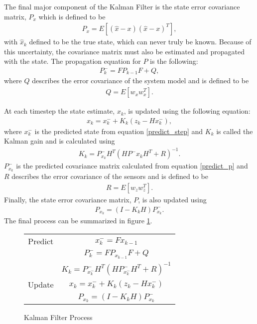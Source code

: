 The final major component of the Kalman Filter is the state error covariance matrix, $P_x$ which is defined to be \cite{kf_derivation}
\begin{align}
P_x = E[(\hat{x} - x)(\hat{x} - x)^T],
\end{align} 
with $\hat{x}_k$ defined to be the true state, which can never truly be known. Because of this uncertainty, the covariance matrix must also be estimated and propagated with the state. The propagation equation for $P$ is the following:
\begin{align}\label{predict_p}
P^-_{k} = FP_{k-1}F + Q,
\end{align} 
where $Q$ describes the error covariance of the system model and is defined to be
\begin{align}
Q = E[w_xw_x^T].
\end{align} 

At each timestep the state estimate, $x_k$, is updated using the following equation:
\begin{align}
x_{k} = x^-_{k} + K_k(z_k - Hx^-_k),
\end{align} 
where $x^-_k$ is the predicted state from equation \eqref{predict_step} and $K_k$ is called the Kalman gain and is calculated using
\begin{align}
K_k = P^-_{x_k}H^T(HP^-{x_k}H^T + R)^{-1}.
\end{align} 
$P^-_{x_k}$ is the predicted covariance matrix calculated from equation \eqref{predict_p} and $R$ describes the error covariance of the sensors and is defined to be
\begin{align}
R = E[w_zw_z^T].
\end{align} 
Finally, the state error covariance matrix, $P$, is also updated using
\begin{align}
P_{x_k} = (I - K_kH)P^-_{x_k}.
\end{align} 
The final process can be summarized in figure \ref{KF Process}.

\begin{figure}[h]
\begin{center}
\begin{tabular}{ | c | c | } 
	\hline
	Predict & $x^-_{k} = Fx_{k-1}$ \\
	\space	& $P^-_{k} = FP_{x_{k-1}}F + Q $ \\ 
	\hline \space & $K_{k} = P^-_{x^-_k}H^T(HP^-_{x^-_k}H^T + R)^{-1}$ \\
	Update & $x_{k} = x^-_{k} + K_k(z_k - Hx^-_k)$ \\ 
	\space & $P_{x_k} = (I - K_kH)P^-_{x_k}$ \\ 
	\hline
\end{tabular}
\end{center}
\caption{Kalman Filter Process \cite{kf_derivation}}
\label{KF Process}
\end{figure}



